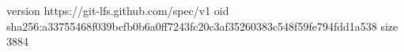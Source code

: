 version https://git-lfs.github.com/spec/v1
oid sha256:a33755468f039bcfb0b6a0ff7243fc20c3af35260383c548f59fe794fdd1a538
size 3884
